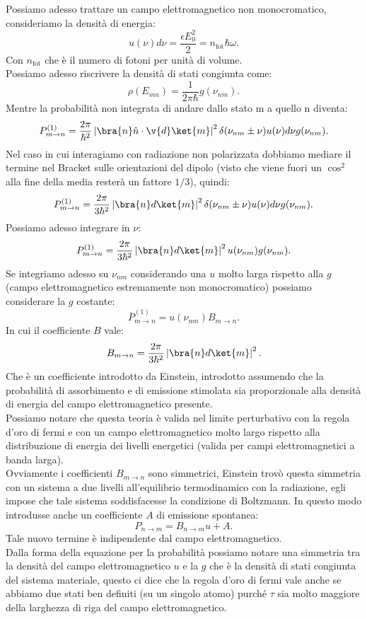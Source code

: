 Possiamo adesso trattare un campo elettromagnetico non monocromatico, consideriamo la densità di energia:
\[
    u(\nu) d\nu = \frac{\epsilon E_0^2}{2} = n_\text{fot}\hbar \omega 
.\] 
Con $n_\text{fot} $ che è il numero di fotoni per unità di volume.\\
Possiamo adesso riscrivere la densità di stati congiunta come:
\[
    \rho(E_{mn}) = \frac{1}{2\pi\hbar }g(\nu_{nm}) 
.\] 
Mentre la probabilità non integrata di andare dallo stato m a quello n diventa:
\[
    P^{(1)}_{m\to n} =
    \frac{2\pi}{\hbar ^2}\left|\bra{n}\hat{n}\cdot \v{d} \ket{m}\right|^2
    \delta (\nu_{nm}\pm \nu) u(\nu) d\nu g(\nu_{nm}) 
.\] 
Nel caso in cui interagiamo con radiazione non polarizzata dobbiamo mediare il termine nel Bracket sulle orientazioni del dipolo (visto che viene fuori un $\cos^2$ alla fine della media resterà un fattore $1 /3$), quindi:
\[
    P^{(1)}_{m\to n} =
    \frac{2\pi}{3\hbar ^2}\left|\bra{n}d \ket{m}\right|^2
    \delta (\nu_{nm}\pm \nu) u(\nu) d\nu g(\nu_{nm}) 
.\]
Possiamo adesso integrare in $\nu$:
\[
    P^{(1) }_{m\to n}= \frac{2\pi}{3\hbar ^2}\left|\bra{n}d \ket{m}\right|^2
    u(\nu_{nm}) g(\nu_{nm}) 
.\] 
Se integriamo adesso su $\nu_{nm}$ considerando una $u$ molto larga rispetto alla $g$  (campo elettromagnetico estremamente non monocromatico) possiamo considerare la $g$ costante:
\[
    \overline{P}^{(1)}_{m\to n} =
    u(\nu_{nm}) B_{m\to n}
.\]
In cui il coefficiente $B$ vale:
\[
B_{m\to n} =
\frac{2\pi}{3\hbar ^2}\left|\bra{n}d \ket{m}\right|^2
.\] 
Che è un coefficiente introdotto da Einstein, introdotto assumendo che la probabilità di assorbimento e di emissione stimolata sia proporzionale alla densità di energia del campo elettromagnetico presente. \\
Possiamo notare che questa teoria è valida nel limite perturbativo con la regola d'oro di fermi e con un campo elettromagnetico molto largo rispetto alla distribuzione di energia dei livelli energetici (valida per campi elettromagnetici a banda larga).\\
Ovviamente i coefficienti $B_{m\to n}$ sono simmetrici, Einstein trovò questa simmetria con un sistema a due livelli all'equilibrio termodinamico con la radiazione, egli impose che tale sistema soddisfacesse la condizione di Boltzmann. In questo modo introdusse anche un coefficiente $A$ di emissione spontanea:
\[
P_{n\to m} = B_{n\to m} u + A
.\] 
Tale nuovo termine è indipendente dal campo elettromagnetico.\\
Dalla forma della equazione per la probabilità possiamo notare una simmetria tra la densità del campo elettromagnetico $u$ e la $g$ che è la densità di stati congiunta del sistema materiale, questo ci dice che la regola d'oro di fermi vale anche se abbiamo due stati ben definiti (su un singolo atomo) purché $\tau$ sia molto maggiore della larghezza di riga del campo elettromagnetico.\\
